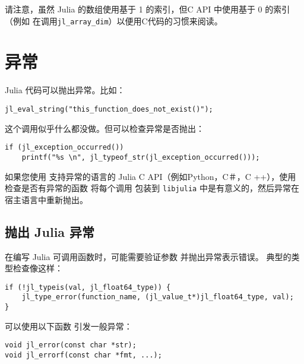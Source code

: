 请注意，虽然 Julia 的数组使用基于 1 的索引，但C API 中使用基于 0 的索引（例如 在调用\texttt{jl\_array\_dim}）以便用C代码的习惯来阅读。



\hypertarget{4029112619480312893}{}


\section{异常}



Julia 代码可以抛出异常。比如：




\begin{lstlisting}
jl_eval_string("this_function_does_not_exist()");
\end{lstlisting}



这个调用似乎什么都没做。但可以检查异常是否抛出：




\begin{lstlisting}
if (jl_exception_occurred())
    printf("%s \n", jl_typeof_str(jl_exception_occurred()));
\end{lstlisting}



如果您使用 支持异常的语言的 Julia C API（例如Python，C＃，C ++），使用 检查是否有异常的函数 将每个调用 包装到 \texttt{libjulia} 中是有意义的，然后异常在宿主语言中重新抛出。



\hypertarget{3345506826925468977}{}


\subsection{抛出 Julia 异常}



在编写 Julia 可调用函数时，可能需要验证参数 并抛出异常表示错误。 典型的类型检查像这样：




\begin{lstlisting}
if (!jl_typeis(val, jl_float64_type)) {
    jl_type_error(function_name, (jl_value_t*)jl_float64_type, val);
}
\end{lstlisting}



可以使用以下函数 引发一般异常：




\begin{lstlisting}
void jl_error(const char *str);
void jl_errorf(const char *fmt, ...);
\end{lstlisting}



